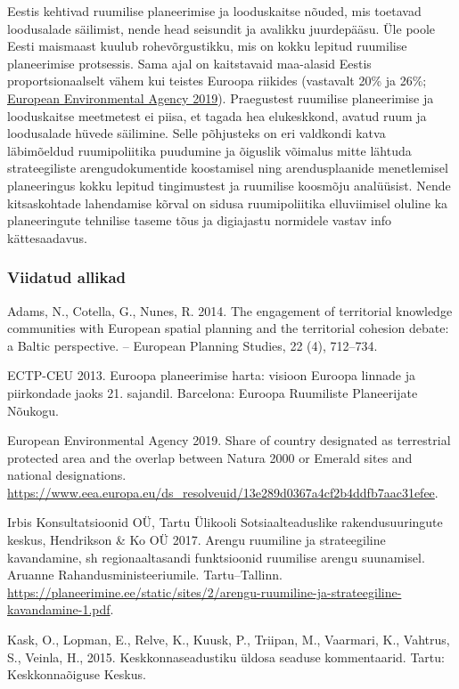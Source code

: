 \documentclass[estonian,]{article}
\begin{document}
Eestis kehtivad ruumilise planeerimise ja looduskaitse nõuded, mis toetavad loodusalade säilimist, nende head seisundit ja avalikku juurdepääsu. Üle poole Eesti maismaast kuulub rohevõrgustikku, mis on kokku lepitud ruumilise planeerimise protsessis. Sama ajal on kaitstavaid maa-alasid Eestis proportsionaalselt vähem kui teistes Euroopa riikides (vastavalt 20\% ja 26\%; \protect\hyperlink{European2019}{European Environmental Agency 2019}). Praegustest ruumilise planeerimise ja looduskaitse meetmetest ei piisa, et tagada hea elukeskkond, avatud ruum ja loodusalade hüvede säilimine. Selle põhjusteks on eri valdkondi katva läbimõeldud ruumipoliitika puudumine ja õiguslik võimalus mitte lähtuda strateegiliste arengudokumentide koostamisel ning arendusplaanide menetlemisel planeeringus kokku lepitud tingimustest ja ruumilise koosmõju analüüsist. Nende kitsaskohtade lahendamise kõrval on sidusa ruumipoliitika elluviimisel oluline ka planeeringute tehnilise taseme tõus ja digiajastu normidele vastav info kättesaadavus.

\hypertarget{viidatud-allikad-14}{%
\subsubsection*{Viidatud allikad}\label{viidatud-allikad-14}}

Adams, N., Cotella, G., Nunes, R. 2014. The engagement of territorial knowledge communities with European spatial planning and the territorial cohesion debate: a Baltic perspective. -- European Planning Studies, 22 (4), 712--734.

ECTP-CEU 2013. Euroopa planeerimise harta: visioon Euroopa linnade ja piirkondade jaoks 21. sajandil. Barcelona: Euroopa Ruumiliste Planeerijate Nõukogu.

European Environmental Agency 2019. Share of country designated as terrestrial protected area and the overlap between Natura 2000 or Emerald sites and national designations. \url{https://www.eea.europa.eu/ds_resolveuid/13e289d0367a4cf2b4ddfb7aac31efee}.

Irbis Konsultatsioonid OÜ, Tartu Ülikooli Sotsiaalteaduslike rakendusuuringute keskus, Hendrikson \& Ko OÜ 2017. Arengu ruumiline ja strateegiline kavandamine, sh regionaaltasandi funktsioonid ruumilise arengu suunamisel. Aruanne Rahandusministeeriumile. Tartu--Tallinn. \url{https://planeerimine.ee/static/sites/2/arengu-ruumiline-ja-strateegiline-kavandamine-1.pdf}.

Kask, O., Lopman, E., Relve, K., Kuusk, P., Triipan, M., Vaarmari, K., Vahtrus, S., Veinla, H., 2015. Keskkonnaseadustiku üldosa seaduse kommentaarid. Tartu: Keskkonnaõiguse Keskus.
\end{document}

